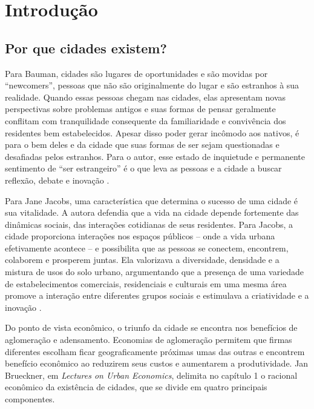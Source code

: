 \chapter{Introdução}

\section{Por que cidades existem?}

Para Bauman, cidades são lugares de oportunidades e são movidas por ``newcomers'', pessoas que não são originalmente do lugar e são estranhos à sua realidade. Quando essas pessoas chegam nas cidades, elas apresentam novas perspectivas sobre problemas antigos e suas formas de pensar geralmente conflitam com tranquilidade consequente da familiaridade e convivência dos residentes bem estabelecidos. Apesar disso poder gerar incômodo aos nativos, é para o bem deles e da cidade que suas formas de ser sejam questionadas e desafiadas pelos estranhos. Para o autor, esse estado de inquietude e permanente sentimento de ``ser estrangeiro'' é o que leva as pessoas e a cidade a buscar reflexão, debate e inovação \cite{bauman2003city}.

Para Jane Jacobs, uma característica que determina o sucesso de uma cidade é sua vitalidade. A autora defendia que a vida na cidade depende fortemente das dinâmicas sociais, das interações cotidianas de seus residentes. Para Jacobs, a cidade proporciona interações nos espaços públicos -- onde a vida urbana efetivamente acontece -- e possibilita que as pessoas se conectem, encontrem, colaborem e prosperem juntas. Ela valorizava a diversidade, densidade e a mistura de usos do solo urbano, argumentando que a presença de uma variedade de estabelecimentos comerciais, residenciais e culturais em uma mesma área promove a interação entre diferentes grupos sociais e estimulava a criatividade e a inovação \cite{jacobs1961death}.

Do ponto de vista econômico, o triunfo da cidade se encontra nos benefícios de aglomeração e adensamento. Economias de aglomeração permitem que firmas diferentes escolham ficar geograficamente próximas umas das outras e encontrem benefício econômico ao reduzirem seus custos e aumentarem a produtividade. Jan Brueckner, em \textit{Lectures on Urban Economics}, delimita no capítulo 1 o racional econômico da existência de cidades, que se divide em quatro principais componentes.

